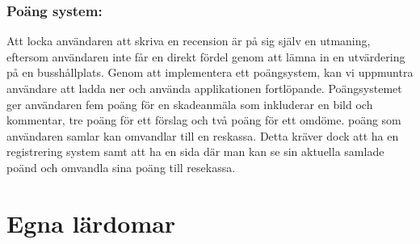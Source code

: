 \documentclass{article}
\begin{document}
\subsubsection*{Poäng system: }
Att locka användaren att skriva en recension är på sig själv en utmaning, eftersom användaren inte får en direkt fördel genom att lämna in en utvärdering på en busshållplats. Genom att implementera ett poängsystem, kan vi uppmuntra användare att ladda ner och använda applikationen fortlöpande. Poängsystemet ger användaren fem poäng för en skadeanmäla som inkluderar en bild och kommentar, tre poäng för ett förslag och två poäng för ett omdöme. poäng som användaren samlar kan omvandlar till en reskassa. Detta kräver dock att ha en registrering system samt att ha en sida där man kan se sin aktuella samlade poänd och omvandla sina poäng till resekassa.

\section*{Egna lärdomar}
\end{document}
